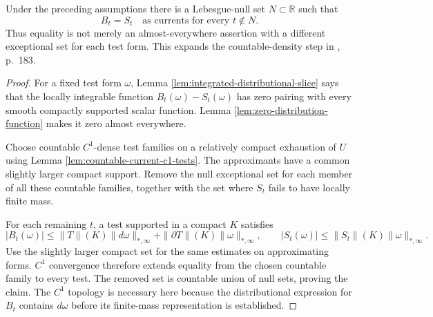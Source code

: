 \begin{proposition}\label{prop:slice-common-exceptional-set}
Under the preceding assumptions there is a Lebesgue-null set $N\subset\mathbb R$ such that
\[
 B_t=S_t\quad\text{as currents for every }t\notin N.
\]
Thus equality is not merely an almost-everywhere assertion with a different exceptional set for each test form. This expands the countable-density step in \cite{Sim18}, p.~183.
\end{proposition}
\begin{proof}
For a fixed test form $\omega$, Lemma \ref{lem:integrated-distributional-slice} says that the locally integrable function $B_t(\omega)-S_t(\omega)$ has zero pairing with every smooth compactly supported scalar function. Lemma \ref{lem:zero-distribution-function} makes it zero almost everywhere.

Choose countable $C^1$-dense test families on a relatively compact exhaustion of $U$ using Lemma \ref{lem:countable-current-c1-tests}. The approximants have a common slightly larger compact support. Remove the null exceptional set for each member of all these countable families, together with the set where $S_t$ fails to have locally finite mass.

For each remaining $t$, a test supported in a compact $K$ satisfies
\[
 |B_t(\omega)|\leq\|T\|(K)\|d\omega\|_{*,\infty}
                  +\|\partial T\|(K)\|\omega\|_{*,\infty},
 \qquad |S_t(\omega)|\leq\|S_t\|(K)\|\omega\|_{*,\infty}.
\]
Use the slightly larger compact set for the same estimates on approximating forms. $C^1$ convergence therefore extends equality from the chosen countable family to every test. The removed set is countable union of null sets, proving the claim. The $C^1$ topology is necessary here because the distributional expression for $B_t$ contains $d\omega$ before its finite-mass representation is established.
\end{proof}

